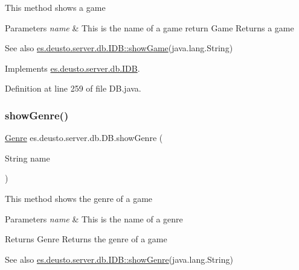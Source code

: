 This method shows a game 
\begin{DoxyParams}{Parameters}
{\em name} & This is the name of a game return Game Returns a game \\
\hline
\end{DoxyParams}
\begin{DoxySeeAlso}{See also}
\hyperlink{interfacees_1_1deusto_1_1server_1_1db_1_1_i_d_b_a572028cc62d36bebee977200b55eba8b}{es.\+deusto.\+server.\+db.\+I\+D\+B\+::show\+Game}(java.\+lang.\+String) 
\end{DoxySeeAlso}


Implements \hyperlink{interfacees_1_1deusto_1_1server_1_1db_1_1_i_d_b_a572028cc62d36bebee977200b55eba8b}{es.\+deusto.\+server.\+db.\+I\+DB}.



Definition at line 259 of file D\+B.\+java.

\mbox{\label{classes_1_1deusto_1_1server_1_1db_1_1_d_b_a207ddeb183db925dc20f095033aa4d94}} 
\subsubsection{\texorpdfstring{show\+Genre()}{showGenre()}}
{\footnotesize\ttfamily \hyperlink{classes_1_1deusto_1_1server_1_1db_1_1data_1_1_genre}{Genre} es.\+deusto.\+server.\+db.\+D\+B.\+show\+Genre (\begin{DoxyParamCaption}\item[{String}]{name }\end{DoxyParamCaption})}

This method shows the genre of a game 
\begin{DoxyParams}{Parameters}
{\em name} & This is the name of a genre \\
\hline
\end{DoxyParams}
\begin{DoxyReturn}{Returns}
Genre Returns the genre of a game 
\end{DoxyReturn}
\begin{DoxySeeAlso}{See also}
\hyperlink{interfacees_1_1deusto_1_1server_1_1db_1_1_i_d_b_a9023bdad77781d95fc2e556d1935f763}{es.\+deusto.\+server.\+db.\+I\+D\+B\+::show\+Genre}(java.\+lang.\+String) 
\end{DoxySeeAlso}



